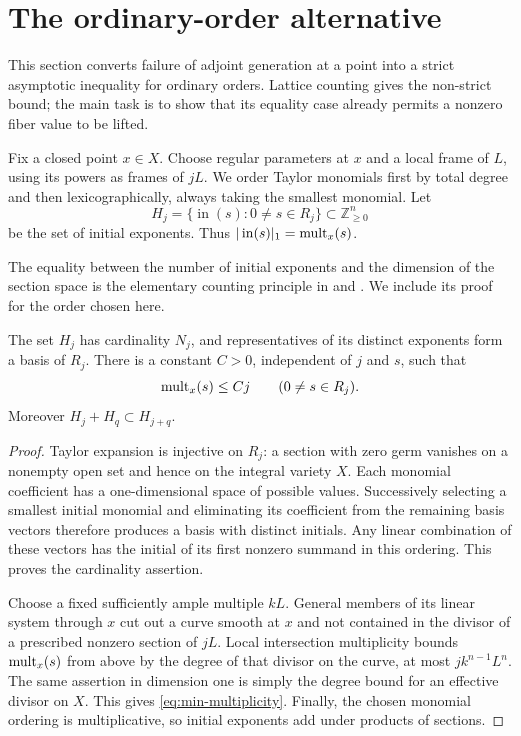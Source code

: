 \section{The ordinary-order alternative}
\label{sec:min-ordinary}

This section converts failure of adjoint generation at a point into a strict asymptotic inequality for ordinary orders. Lattice counting gives the non-strict bound; the main task is to show that its equality case already permits a nonzero fiber value to be lifted.

Fix a closed point $x\in X$. Choose regular parameters at $x$ and a local frame of $L$, using its powers as frames of $jL$. We order Taylor monomials first by total degree and then lexicographically, always taking the smallest monomial. Let
\[
 H_j=\{\operatorname{in}(s):0\ne s\in R_j\}
       \subset\mathbb{Z}_{\geq0}^n
\]
be the set of initial exponents. Thus $|\operatorname{in}(s)|_1=\operatorname{mult}_x(s)$.

The equality between the number of initial exponents and the dimension of the section space is the elementary counting principle in \cite[Lemma~1.4]{LM09} and \cite[Proposition~2.6]{KK12}. We include its proof for the order chosen here.

\begin{lemma}
\label{lem:min-initials}
The set $H_j$ has cardinality $N_j$, and representatives of its distinct exponents form a basis of $R_j$. There is a constant $C>0$, independent of $j$ and $s$, such that
\begin{equation}
\label{eq:min-multiplicity}
 \operatorname{mult}_x(s)\leq Cj\qquad(0\ne s\in R_j).
\end{equation}
Moreover $H_j+H_q\subset H_{j+q}$.
\end{lemma}

\begin{proof}
Taylor expansion is injective on $R_j$: a section with zero germ vanishes on a nonempty open set and hence on the integral variety $X$. Each monomial coefficient has a one-dimensional space of possible values. Successively selecting a smallest initial monomial and eliminating its coefficient from the remaining basis vectors therefore produces a basis with distinct initials. Any linear combination of these vectors has the initial of its first nonzero summand in this ordering. This proves the cardinality assertion.

Choose a fixed sufficiently ample multiple $kL$. General members of its linear system through $x$ cut out a curve smooth at $x$ and not contained in the divisor of a prescribed nonzero section of $jL$. Local intersection multiplicity bounds $\operatorname{mult}_x(s)$ from above by the degree of that divisor on the curve, at most $jk^{n-1}L^n$. The same assertion in dimension one is simply the degree bound for an effective divisor on $X$. This gives \eqref{eq:min-multiplicity}. Finally, the chosen monomial ordering is multiplicative, so initial exponents add under products of sections.
\end{proof}


